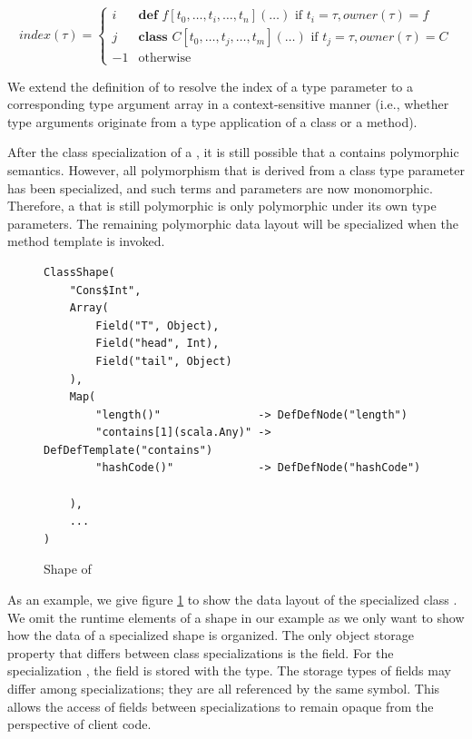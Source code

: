 $$
index(\tau) = 
\begin{cases}
	i  & \textbf{def } f[t_0, \ldots, t_i, \ldots, t_n](\ldots) \text{ if } t_i = \tau, owner(\tau)=f \\
	j  & \textbf{class } C[t_0, \ldots, t_j, \ldots, t_m](\ldots) \text{ if } t_j = \tau, owner(\tau)=C \\
	-1 & \text{otherwise}
\end{cases}
$$

We extend the definition of  to resolve the index of a type parameter to a corresponding type argument array in a context-sensitive manner (i.e., whether type arguments originate from a type application of a class or a method).

After the class specialization of a , it is still possible that a  contains polymorphic semantics.
However, all polymorphism that is derived from a class type parameter has been specialized, and such terms and parameters are now monomorphic.
Therefore, a  that is still polymorphic is only polymorphic under its own type parameters.
The remaining polymorphic data layout will be specialized when the method template is invoked.

\begin{figure}[!htb]
\begin{verbatim}
ClassShape(
	"Cons$Int",
	Array(
		Field("T", Object),
		Field("head", Int),
		Field("tail", Object)
	),
	Map(
		"length()"               -> DefDefNode("length")
		"contains[1](scala.Any)" -> DefDefTemplate("contains")
		"hashCode()"             -> DefDefNode("hashCode")
	
	),
	...
)
\end{verbatim}
\caption{Shape of }
\label{shape:cons-int}
\end{figure}

As an example, we give figure \ref{shape:cons-int} to show the data layout of the specialized class .
We omit the runtime elements of a shape in our example as we only want to show how the data of a specialized shape is organized.
The only object storage property that differs between class specializations is the  field.
For the specialization , the  field is stored with the  type.
The storage types of fields may differ among specializations; they are all referenced by the same symbol.
This allows the access of fields between specializations to remain opaque from the perspective of client code.

